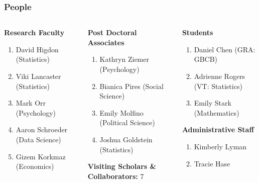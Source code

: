 \documentclass[compress]{beamer}
\begin{document}
	\begin{frame}[Blank] \frametitle{People}
		\small
		\begin{columns}
			\begin{column}{0.3\textwidth}
				\textbf{Research Faculty}
				\begin{enumerate}
					\item David Higdon (Statistics)
					\item Viki Lancaster (Statistics)
					\item Mark Orr (Psychology)
					\item Aaron Schroeder (Data Science)
					\item Gizem Korkmaz (Economics)
				\end{enumerate}
			\end{column}
		
			\begin{column}{0.3\textwidth}
				\textbf{Post Doctoral Associates}
				\begin{enumerate}
					\item Kathryn Ziemer (Psychology)
					\item Bianica Pires (Social Science)
					\item Emily Molfino (Political Science)
					\item Joshua Goldstein (Statistics)
				\end{enumerate}
			
				\textbf{Visiting Scholars \& Collaborators:} 7
			\end{column}

			\begin{column}{0.3\textwidth}
				\textbf{Students}
				\begin{enumerate}
					\item Daniel Chen (GRA: GBCB)
					\item Adrienne Rogers (VT: Statistics)
					\item Emily Stark (Mathematics)
				\end{enumerate}
				
				\textbf{Administrative Staff}
				\begin{enumerate}
					\item Kimberly Lyman
					\item Tracie Hase
				\end{enumerate}
			\end{column}
		\end{columns}
	\end{frame}
\end{document}
